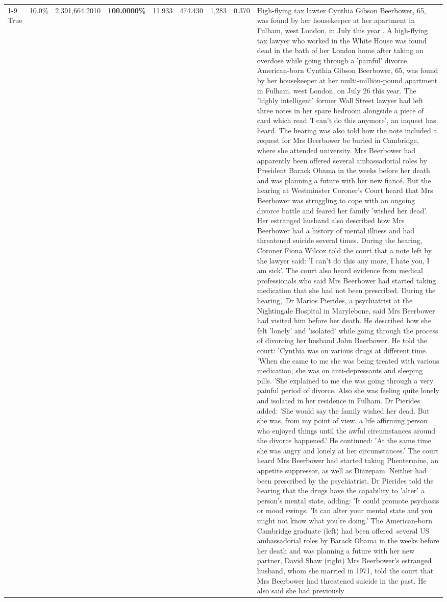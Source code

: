 \begin{table}[H]
\begin{tabular}{lllrlllll}
\cline{1-9}
True & 10.0\% & 2,391,664.2010 & \bfseries \color{red} 100.0000\% & 11.933 & 474.430 & 1,283 & 0.370 & High-flying tax lawter Cynthia Gibson Beerbower, 65, was found by her housekeeper at her apartment in Fulham, west London, in July this year . A high-flying tax lawyer who worked in the White House was found dead in the bath of her London home after taking an overdose while going through a 'painful' divorce. American-born Cynthia Gibson Beerbower, 65, was found by her housekeeper at her multi-million-pound apartment in Fulham, west London, on July 26 this year. The 'highly intelligent' former Wall Street lawyer had left three notes in her spare bedroom alongside a piece of card which read 'I can't do this anymore', an inquest has heard. The hearing was also told how the note included a request for Mrs Beerbower be buried in Cambridge, where she attended university. Mrs Beerbower had apparently been offered several ambassadorial roles by President Barack Obama in the weeks before her death and was planning a future with her new fiancé. But the hearing at Westminster Coroner's Court heard that Mrs Beerbower was struggling to cope with an ongoing divorce battle and feared her family 'wished her dead'. Her estranged husband also described how Mrs Beerbower had a history of mental illness and had threatened suicide several times. During the hearing, Coroner Fiona Wilcox told the court that a note left by the lawyer said: 'I can't do this any more, I hate you, I am sick'. The court also heard evidence from medical professionals who said Mrs Beerbower had started taking medication that she had not been prescribed. During the hearing, Dr Marios Pierides, a psychiatrist at the Nightingale Hospital in Marylebone, said Mrs Beerbower had visited him before her death. He described how she felt 'lonely' and 'isolated' while going through the process of divorcing her husband John Beerbower. He told the court: 'Cynthia was on various drugs at different time. 'When she came to me she was being treated with various medication, she was on anti-depressants and sleeping pills. 'She explained to me she was going through a very painful period of divorce. Also she was feeling quite lonely and isolated in her residence in Fulham. Dr Pierides added: 'She would say the family wished her dead. But she was, from my point of view, a life affirming person who enjoyed things until the awful circumstances around the divorce happened.' He continued: 'At the same time she was angry and lonely at her circumstances.' The court heard Mrs Beerbower had started taking Phentermine, an appetite suppressor, as well as Diazepam. Neither had been prescribed by the psychiatrist. Dr Pierides told the hearing that the drugs have the capability to 'alter' a person's mental state, adding: 'It could promote psychosis or mood swings. 'It can alter your mental state and you might not know what you're doing.' The American-born Cambridge graduate (left) had been offered several US ambassadorial roles by Barack Obama in the weeks before her death and was planning a future with her new partner, David Shaw (right) Mrs Beerbower's estranged husband, whom she married in 1971, told the court that Mrs Beerbower had threatened suicide in the past. He also said she had previously 
\end{tabular}
\end{table}
